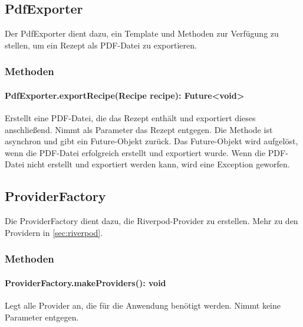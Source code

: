 \documentclass[parskip=full]{scrartcl}
\begin{document}
\subsection{PdfExporter}
Der PdfExporter dient dazu, ein Template und Methoden zur Verfügung zu stellen, um ein Rezept als PDF-Datei zu exportieren.
\subsubsection{Methoden}
\paragraph{PdfExporter.exportRecipe(Recipe recipe): Future<void>}
Erstellt eine PDF-Datei, die das Rezept enthält und exportiert dieses anschließend. Nimmt als Parameter das Rezept entgegen. Die Methode ist asynchron und gibt ein Future-Objekt zurück. Das Future-Objekt wird aufgelöst, wenn die PDF-Datei erfolgreich erstellt und exportiert wurde. Wenn die PDF-Datei nicht erstellt und exportiert werden kann, wird eine Exception geworfen.
\subsection{ProviderFactory}
Die ProviderFactory dient dazu, die Riverpod-Provider zu erstellen. Mehr zu den Providern in \ref{sec:riverpod}.
\subsubsection{Methoden}
\paragraph{ProviderFactory.makeProviders(): void}
Legt alle Provider an, die für die Anwendung benötigt werden. Nimmt keine Parameter entgegen.
\newpage
\end{document}
